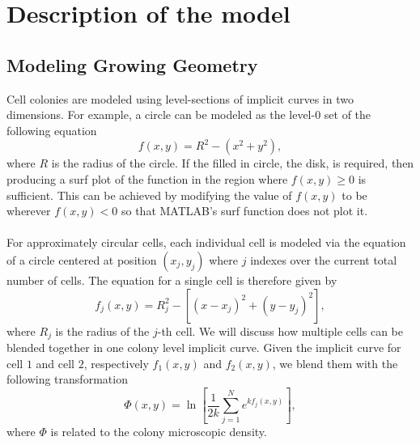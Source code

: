 \chapter{ Description of the model \label{ch:numero_uno}}
\section{Modeling Growing Geometry }
Cell colonies are modeled using level-sections of implicit curves in two dimensions. For example, a circle can be modeled as the level-0 set of the following equation
\begin{equation*}
    f(x,y) =R^2-( x^2 + y^2),
\end{equation*}
where $R$ is the radius of the circle. If the filled in circle, the disk, is required, then producing a surf plot of the function in the region where $f(x,y) \geq 0$ is sufficient. This can be achieved by modifying the value of $f(x,y)$ to be  wherever $f(x,y)<0$ so that MATLAB's surf function does not plot it.
\\
\\
For approximately circular cells, each individual cell is modeled via the equation of a circle centered at position $(x_j,y_j)$ where $j$ indexes over the current total number of cells. The equation for a single cell is therefore given by
\begin{equation*}
    f_j(x,y) =R_j^2- \left[ (x-x_j)^2 + (y-y_j)^2\right],
\end{equation*}
where $R_j$ is the radius of the $j$-th cell. We will discuss how multiple cells can be blended together in one colony level implicit curve. Given the implicit curve for cell $1$ and cell $2$, respectively $f_1(x,y)$ and $f_2(x,y)$, we blend them with the following transformation
\begin{equation*}
    \Phi(x,y) = \ln{ \left[ \frac{1}{2 k} \sum_{j=1}^N{ e^{k f_j(x,y)}} \right]},
\end{equation*}
where $\Phi$ is related to the colony microscopic density.








